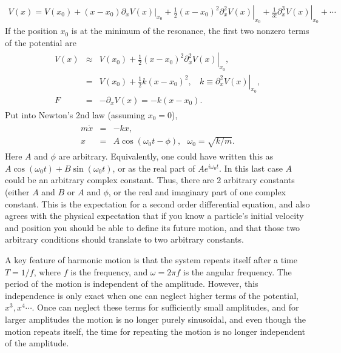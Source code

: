 \documentclass[letterpaper,10pt,english]{sphinxmanual}
\begin{document}
\begin{equation*}
\begin{split}
\begin{equation}
V(x)=V(x_0)+(x-x_0)\left.\partial_xV(x)\right|_{x_0}+\frac{1}{2}(x-x_0)^2\left.\partial_x^2V(x)\right|_{x_0}
+\frac{1}{3!}\left.\partial_x^3V(x)\right|_{x_0}+\cdots
\label{_auto37} \tag{47}
\end{equation}
\end{split}
\end{equation*}
If the position \(x_0\) is at the minimum of the resonance, the first two non\sphinxhyphen{}zero terms of the potential are
\begin{equation*}
\begin{split}
\begin{eqnarray}
V(x)&\approx& V(x_0)+\frac{1}{2}(x-x_0)^2\left.\partial_x^2V(x)\right|_{x_0},\\
\nonumber
&=&V(x_0)+\frac{1}{2}k(x-x_0)^2,~~~~k\equiv \left.\partial_x^2V(x)\right|_{x_0},\\
\nonumber
F&=&-\partial_xV(x)=-k(x-x_0).
\end{eqnarray}
\end{split}
\end{equation*}
Put into Newton’s 2nd law (assuming \(x_0=0\)),
\begin{equation*}
\begin{split}
\begin{eqnarray}
m\ddot{x}&=&-kx,\\
x&=&A\cos(\omega_0 t-\phi),~~~\omega_0=\sqrt{k/m}.
\end{eqnarray}
\end{split}
\end{equation*}
Here \(A\) and \(\phi\) are arbitrary. Equivalently, one could have
written this as \(A\cos(\omega_0 t)+B\sin(\omega_0 t)\), or as the real
part of \(Ae^{i\omega_0 t}\). In this last case \(A\) could be an
arbitrary complex constant. Thus, there are 2 arbitrary constants
(either \(A\) and \(B\) or \(A\) and \(\phi\), or the real and imaginary part
of one complex constant. This is the expectation for a second order
differential equation, and also agrees with the physical expectation
that if you know a particle’s initial velocity and position you should
be able to define its future motion, and that those two arbitrary
conditions should translate to two arbitrary constants.

A key feature of harmonic motion is that the system repeats itself
after a time \(T=1/f\), where \(f\) is the frequency, and \(\omega=2\pi f\)
is the angular frequency. The period of the motion is independent of
the amplitude. However, this independence is only exact when one can
neglect higher terms of the potential, \(x^3, x^4\cdots\). Once can
neglect these terms for sufficiently small amplitudes, and for larger
amplitudes the motion is no longer purely sinusoidal, and even though
the motion repeats itself, the time for repeating the motion is no
longer independent of the amplitude.
\end{document}
